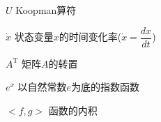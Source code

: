 
\begin{listofnotations}
  \item [$U$] Koopman算符
  \item [$\dot{x}$] 状态变量$x$的时间变化率($\dot{x}=\dfrac{dx}{dt}$)
  \item [$A^{\mathrm T}$] 矩阵$A$的转置
  \item [$e^x$] 以自然常数$e$为底的指数函数
  \item [$<f,g>$] 函数的内积
\end{listofnotations}
